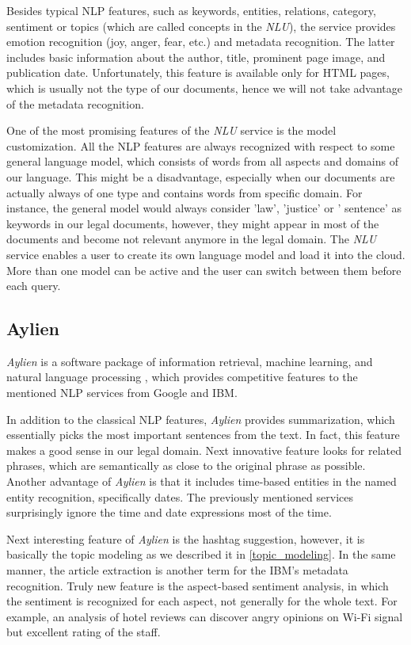 \documentclass[
  digital, %
  table,   %
  lof,     %
  lot,     %
]{fithesis3}
\begin{document}
Besides typical NLP features, such as keywords, entities, relations, category, sentiment or topics (which are called concepts in the \textit{NLU}), the service provides emotion recognition (joy, anger, fear, etc.) and metadata recognition.
The latter includes basic information about the author, title, prominent page image, and publication date.
Unfortunately, this feature is available only for HTML pages, which is usually not the type of our documents, hence we will not take advantage of the metadata recognition.

One of the most promising features of the \textit{NLU} service is the model customization.
All the NLP features are always recognized with respect to some general language model, which consists of words from all aspects and domains of our language.
This might be a disadvantage, especially when our documents are actually always of one type and contains words from specific domain.
For instance, the general model would always consider 'law', 'justice' or ' sentence' as keywords in our legal documents, however, they might appear in most of the documents and become not relevant anymore in the legal domain.
The \textit{NLU} service enables a user to create its own language model and load it into the cloud.
More than one model can be active and the user can switch between them before each query.

\subsection{Aylien}
\textit{Aylien} is a software package of information retrieval, machine learning, and natural language processing \cite{aylienNLP}, which provides competitive features to the mentioned NLP services from Google and IBM.

In addition to the classical NLP features, \textit{Aylien} provides summarization, which essentially picks the most important sentences from the text. In fact, this feature makes a good sense in our legal domain. Next innovative feature looks for related phrases, which are semantically as close to the original phrase as possible. Another advantage of \textit{Aylien} is that it includes time-based entities in the named entity recognition, specifically dates. The previously mentioned services surprisingly ignore the time and date expressions most of the time.

Next interesting feature of \textit{Aylien} is the hashtag suggestion, however, it is basically the topic modeling as we described it in \ref{topic_modeling}.
In the same manner, the article extraction is another term for the IBM's metadata recognition.
Truly new feature is the aspect-based sentiment analysis, in which the sentiment is recognized for each aspect, not generally for the whole text.
For example, an analysis of hotel reviews can discover angry opinions on Wi-Fi signal but excellent rating of the staff.
\end{document}
